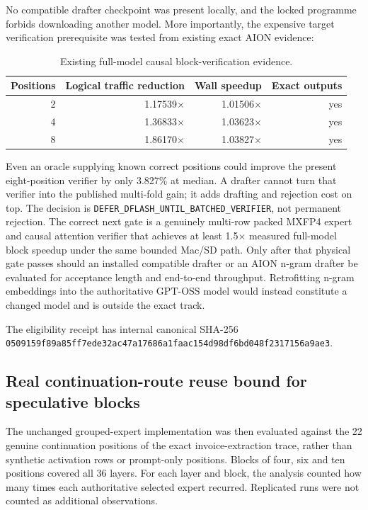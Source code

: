 No compatible drafter checkpoint was present locally, and the locked programme
forbids downloading another model.  More importantly, the expensive target
verification prerequisite was tested from existing exact AION evidence:

\begin{table}[ht]
\centering
\begin{tabular}{rrrr}
\toprule
Positions & Logical traffic reduction & Wall speedup & Exact outputs \\
\midrule
2 & 1.17539$\times$ & 1.01506$\times$ & yes \\
4 & 1.36833$\times$ & 1.03623$\times$ & yes \\
8 & 1.86170$\times$ & 1.03827$\times$ & yes \\
\bottomrule
\end{tabular}
\caption{Existing full-model causal block-verification evidence.}
\end{table}

Even an oracle supplying known correct positions could improve the present
eight-position verifier by only 3.827\% at median.  A drafter cannot turn that
verifier into the published multi-fold gain; it adds drafting and rejection
cost on top.  The decision is
\texttt{DEFER\_DFLASH\_UNTIL\_BATCHED\_VERIFIER}, not permanent rejection.
The correct next gate is a genuinely multi-row packed MXFP4 expert and causal
attention verifier that achieves at least 1.5$\times$ measured full-model block
speedup under the same bounded Mac/SD path.  Only after that physical gate
passes should an installed compatible drafter or an AION n-gram drafter be
evaluated for acceptance length and end-to-end throughput.  Retrofitting
n-gram embeddings into the authoritative GPT-OSS model would instead constitute
a changed model and is outside the exact track.

The eligibility receipt has internal canonical SHA-256
\texttt{0509159f89a85ff7ede32ac47a17686a1faac154d98df6bd048f2317156a9ae3}.

\subsection{Real continuation-route reuse bound for speculative blocks}

The unchanged grouped-expert implementation was then evaluated against the
22 genuine continuation positions of the exact invoice-extraction trace,
rather than synthetic activation rows or prompt-only positions.  Blocks of
four, six and ten positions covered all 36 layers.  For each layer and block,
the analysis counted how many times each authoritative selected expert
recurred.  Replicated runs were not counted as additional observations.

